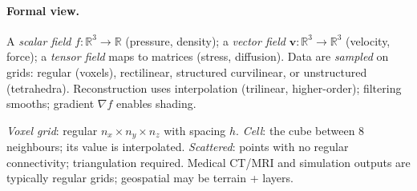 \paragraph{Formal view.} A \emph{scalar field} $f:\mathbb{R}^3\to\mathbb{R}$ (pressure, density); a \emph{vector field} $\mathbf{v}:\mathbb{R}^3\to\mathbb{R}^3$ (velocity, force); a \emph{tensor field} maps to matrices (stress, diffusion). Data are \emph{sampled} on grids: regular (voxels), rectilinear, structured curvilinear, or unstructured (tetrahedra). Reconstruction uses interpolation (trilinear, higher-order); filtering smooths; gradient $\nabla f$ enables shading.

\begin{definition}\label{def:grids}
\emph{Voxel grid}: regular $n_x\times n_y\times n_z$ with spacing $h$. \emph{Cell}: the cube between 8 neighbours; its value is interpolated. \emph{Scattered}: points with no regular connectivity; triangulation required. Medical CT/MRI and simulation outputs are typically regular grids; geospatial may be terrain + layers.
\end{definition}

